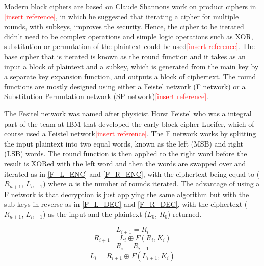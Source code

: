 \documentclass[12pt,twoside,a4paper]{report}
\begin{document}
    Modern block ciphers are based on Claude Shannons work on product ciphers in \textcolor{red}{[insert reference]}, in which he suggested that iterating a cipher for multiple rounds, with subkeys, improves the security. Hence, the cipher to be iterated didn't need to be complex operations and simple logic operations such as XOR, substitution or permutation of the plaintext could be used\textcolor{red}{[insert reference]}. The base cipher that is iterated is known as the round function and it takes as an input a block of plaintext and a subkey, which is generated from the main key by a separate key expansion function, and outputs a block of ciphertext. The round functions are mostly designed using either a Feistel network (F network) or a Substitution Permutation network (SP network)\textcolor{red}{[insert reference]}.
    
    The Fesitel network was named after physicist Horst Feistel who was a integral part of the team at IBM that developed the early block cipher Lucifer, which of course used a Feistel network\textcolor{red}{[insert reference]}. The F network works by splitting the input plaintext into two equal words, known as the left (MSB) and right (LSB) words. The round function is then applied to the right word before the result is XORed with the left word and then the words are swapped over and iterated as in \autoref{F_L_ENC} and \ref{F_R_ENC}, with the ciphertext being equal to ($R_{n+1}$, $L_{n+1}$) where $n$ is the number of rounds iterated. The advantage of using a F network is that decryption is just applying the same algorithm but with the sub keys in reverse as in \autoref{F_L_DEC} and \ref{F_R_DEC}, with the ciphertext ($R_{n+1}$, $L_{n+1}$) as the input and the plaintext ($L_0$, $R_0$) returned.
    
    \begin{equation}
    \label{F_L_ENC}
    L_{i+1} = R_i
    \end{equation}
    \begin{equation}
    \label{F_R_ENC}
    R_{i+1} = L_i \oplus F(R_i, K_i)
    \end{equation}
    \begin{equation}
    \label{F_L_DEC}
    R_i = R_{i+1}
    \end{equation}
    \begin{equation}
    \label{F_R_DEC}
    L_i = R_{i+1} \oplus F(L_{i+1}, K_i)
    \end{equation}
    
\end{document}
